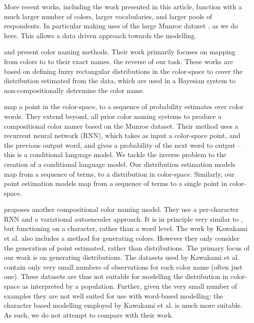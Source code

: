 \documentclass[]{book}
\newcommand{\textcite}{\citet}
\begin{document}
More recent works, including the work presented in this article, function with a much larger number of colors, larger vocabularies, and larger pools of respondents.
In particular making uses of the large Munroe dataset \textcite{Munroe2010XKCDdataset}, as we do here.
This allows a data driven approach towards the modelling.


\textcite{mcmahan2015bayesian} and \textcite{meomcmahanstone:color} present color naming methods.
Their work primarily focuses on mapping from colors to to their exact names, the reverse of our task.
These works are based on defining fuzzy rectangular distributions in the color-space to cover the distribution estimated from the data, which are used in a Bayesian system to non-compositionally determine the color name.


\textcite{2016arXiv160603821M} map a point in the color-space, to a sequence of probability estimates over color words.
They extend beyond, all prior color naming systems to produce a compositional color namer based on the Munroe dataset.
Their method uses a recurrent neural network (RNN), which takes as input a color-space point, and the previous output word, and gives a probability of the next word to output -- this is a conditional language model.
We tackle the inverse problem to the creation of a conditional language model.
Our distribution estimation models map from a sequence of terms, to a distribution in color-space.
Similarly, our point estimation models map from a sequence of terms to a single point in color-space.


\textcite{DBLP:journals/corr/KawakamiDRS16} proposes another compositional color naming model.
They use a per-character RNN and a variational autoencoder approach.
It is in principle very similar to \textcite{2016arXiv160603821M}, but functioning on a character, rather than a word level.
The work by Kawakami et al. also includes a method for generating colors.
However they only consider the generation of point estimated, rather than distributions.
The primary focus of our work is on generating distributions.
The datasets used by Kawakami et al. contain only very small numbers of observations for each color name (often just one).
These datasets are thus not suitable for modelling the distribution in color-space as interpreted by a population.
Further, given the very small number of examples they are not well suited for use with word-based modelling: the character based modelling employed by Kawakami et al. is much more suitable.
As such, we do not attempt to compare with their work.
\end{document}
